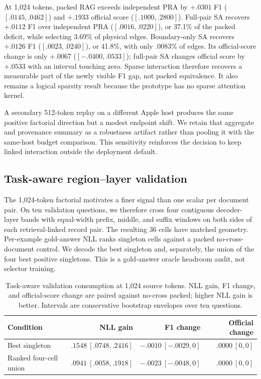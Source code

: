 \documentclass[11pt]{article}
\begin{document}
At 1,024 tokens, packed RAG exceeds independent PRA by $+.0301$ F1
($[.0145,.0462]$) and $+.1933$ official score ($[.1000,.2800]$). Full-pair SA
recovers $+.0112$ F1 over independent PRA ($[.0016,.0220]$), or 37.1\% of the
packed deficit, while selecting 3.69\% of physical edges. Boundary-only SA
recovers $+.0126$ F1 ($[.0023,.0240]$), or 41.8\%, with only .0083\% of edges.
Its official-score change is only $+.0067$ ($[-.0400,.0533]$); full-pair SA
changes official score by $+.0533$ with an interval touching zero. Sparse
interaction therefore recovers a measurable part of the newly visible F1 gap,
not packed equivalence. It also remains a logical sparsity result because the
prototype has no sparse attention kernel.

A secondary 512-token replay on a different Apple host produces the same
positive factorial direction but a modest endpoint shift. We retain that
aggregate and provenance summary as a robustness artifact rather than pooling
it with the same-host budget comparison. This sensitivity reinforces the
decision to keep linked interaction outside the deployment default.
\FloatBarrier

\subsection{Task-aware region--layer validation}

The 1,024-token factorial motivates a finer signal than one scalar per document
pair. On ten validation questions, we therefore cross four contiguous decoder-
layer bands with equal-width prefix, middle, and suffix windows on both sides
of each retrieval-linked record pair. The resulting 36 cells have matched
geometry. Per-example gold-answer NLL ranks singleton cells against a packed
no-cross-document control. We decode the best singleton and, separately, the
union of the four best positive singletons. This is a gold-answer oracle
headroom audit, not selector training.

\begin{table}[H]
\centering
\small
\caption{Task-aware validation consumption at 1,024 source tokens. NLL gain,
F1 change, and official-score change are paired against no-cross packed; higher
NLL gain is better. Intervals are conservative bootstrap envelopes over ten
questions.}
\label{tab:region-layer-validation}
\begin{tabular}{lrrr}
\toprule
Condition & NLL gain & F1 change & Official change \\
\midrule
Best singleton & $.1548\ [ .0748, .2416]$ & $-.0010\ [-.0029,0]$ & $.0000\ [0,0]$ \\
Ranked four-cell union & $.0941\ [ .0058, .1918]$ & $-.0023\ [-.0048,0]$ & $.0000\ [0,0]$ \\
\bottomrule
\end{tabular}
\end{table}
\end{document}
